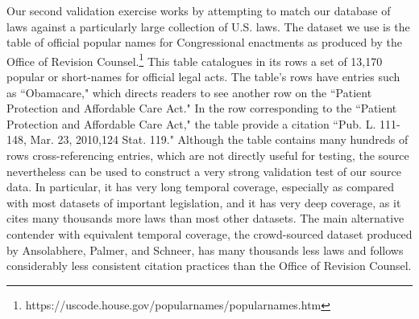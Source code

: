 \documentclass[fleqn,10pt]{wlscirep}
\begin{document}
Our second validation exercise works by attempting to match our database of laws against a particularly large collection of U.S. laws. The dataset we use is the table of official popular names for Congressional enactments as produced by the Office of Revision Counsel.\footnote{https://uscode.house.gov/popularnames/popularnames.htm} This table catalogues in its rows a set of 13,170 popular or short-names for official legal acts. The table's rows have entries such as ``Obamacare," which directs readers to see another row on the ``Patient Protection and Affordable Care Act." In the row corresponding to the ``Patient Protection and Affordable Care Act," the table provide a citation ``Pub. L. 111-148, Mar. 23, 2010,124 Stat. 119." Although the table contains many hundreds of rows cross-referencing entries, which are not directly useful for testing, the source nevertheless can be used to construct a very strong validation test of our source data. In particular, it has very long temporal coverage, especially as compared with most datasets of important legislation, and it has very deep coverage, as it cites many thousands more laws than most other datasets. The main alternative contender with equivalent temporal coverage, the crowd-sourced dataset produced by Ansolabhere, Palmer, and Schneer,\cite{ansolabehere_palmer_schneer_2016} has many thousands less laws and follows considerably less consistent citation practices than the Office of Revision Counsel.
\end{document}
